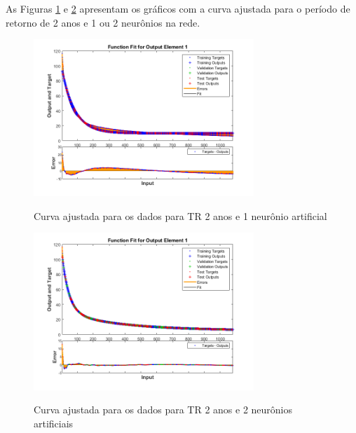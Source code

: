 
As Figuras \ref{fig:tr2-1n} e \ref{fig:tr2-2n} apresentam os gráficos com a curva ajustada para o período de retorno de 2 anos e 1 ou 2 neurônios na rede.

\begin{figure}[H]
    \caption{Curva ajustada para os dados para TR 2 anos e 1 neurônio artificial}
    \centering
    \includegraphics[width=0.74\textwidth]{Textuais/Figuras/NN/tr2-1neuronio.png}
    \label{fig:tr2-1n}
\end{figure}


\begin{figure}[H]
    \caption{Curva ajustada para os dados para TR 2 anos e 2 neurônios artificiais}
    \centering
    \includegraphics[width=0.74\textwidth]{Textuais/Figuras/NN/tr2-2neuronio.png}
    \label{fig:tr2-2n}
\end{figure}

